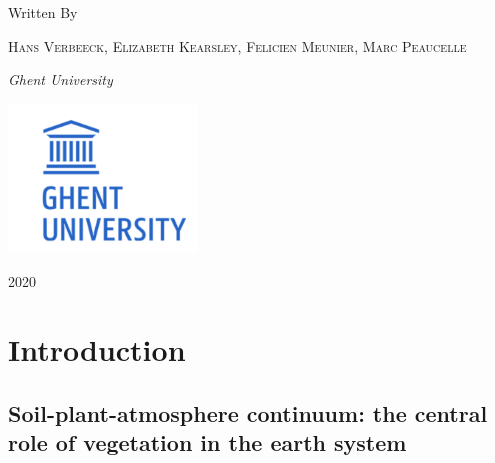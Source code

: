 \documentclass[
  oneside]{book}
\begin{document}
\begin{titlepage}
	Written By
	
	\vspace{0.5\baselineskip} %
	
	{\scshape Hans Verbeeck, Elizabeth Kearsley, Felicien Meunier, Marc Peaucelle \\} %
	
	\vspace{0.5\baselineskip} %
	
	\textit{Ghent University \\} %
	
	\vfill %
	
	
	
	\includegraphics[width = 50mm]{figures/UGhent2.png}
	
	\vspace{0.3\baselineskip} %
	
	2020 %
	

\end{titlepage}



{
\setcounter{tocdepth}{1}
\tableofcontents
}
\mainmatter

\hypertarget{intro}{%
\chapter{Introduction}\label{intro}}

\hypertarget{soil-plant-atmosphere-continuum-the-central-role-of-vegetation-in-the-earth-system}{%
\section{Soil-plant-atmosphere continuum: the central role of vegetation in the earth system}\label{soil-plant-atmosphere-continuum-the-central-role-of-vegetation-in-the-earth-system}}
\end{document}
